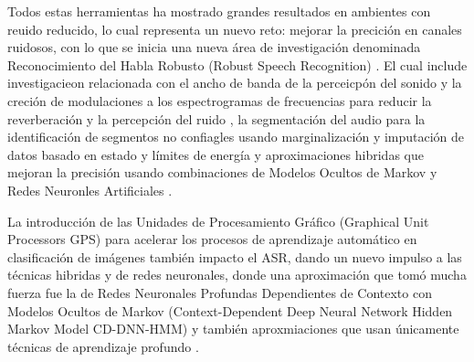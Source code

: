 Todos estas herramientas ha mostrado grandes resultados en ambientes con reuido reducido, lo cual representa un nuevo reto: mejorar la precición en canales ruidosos, con lo que se inicia una nueva área de investigación denominada Reconocimiento del Habla Robusto (Robust Speech Recognition) \cite{SieglerOnSystems,MirghaforiTowardsASR}. El cual include investigacieon relacionada con el ancho de banda de la perceicpón del sonido y la creción de modulaciones a los espectrogramas de frecuencias para reducir la reverberación y la percepción del ruido \cite{Kingsbury1998RobustSpectrogram}, la segmentación del audio para la identificación de segmentos no confiagles usando marginalización y imputación de datos basado en estado y límites de energía \cite{Cooke2001RobustData} y aproximaciones hibridas  que mejoran la precisión usando combinaciones de Modelos Ocultos de Markov y Redes Neuronles Artificiales \cite{BourlardABands}.

La introducción de las Unidades de Procesamiento Gráfico (Graphical Unit Processors GPS) para acelerar los procesos de aprendizaje automático en clasificación de imágenes \cite{KrizhevskyImageNetNetworks} también impacto el ASR, dando un nuevo impulso a las técnicas hibridas y de redes neuronales, donde una aproximación que tomó mucha fuerza fue la de Redes Neuronales Profundas Dependientes de Contexto con Modelos Ocultos de Markov (Context-Dependent Deep Neural Network Hidden Markov Model CD-DNN-HMM) \cite{Yu_2014_1,Xiong2017}  y también aproxmiaciones que usan únicamente técnicas de aprendizaje profundo \cite{Povey_ASRU2011,1401.6984}.

